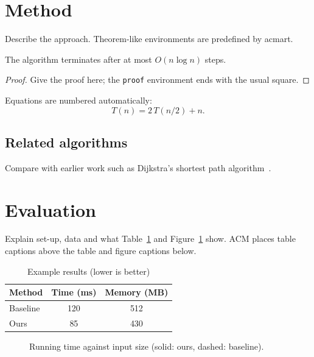 \documentclass[acmsmall]{acmart}
\begin{document}
\section{Method}\label{sec:method}
Describe the approach. Theorem-like environments are predefined by acmart.

\begin{theorem}\label{thm:bound}
  The algorithm terminates after at most $O(n \log n)$ steps.
\end{theorem}
\begin{proof}
  Give the proof here; the \texttt{proof} environment ends with the usual square.
\end{proof}

Equations are numbered automatically:
\begin{equation}
  T(n) = 2\,T(n/2) + n .
  \label{eq:recurrence}
\end{equation}

\subsection{Related algorithms}
Compare with earlier work such as Dijkstra's shortest path algorithm~\cite{dijkstra59}.

\section{Evaluation}\label{sec:eval}
Explain set-up, data and what Table~\ref{tab:results} and Figure~\ref{fig:scaling} show.
ACM places table captions above the table and figure captions below.

\begin{table}[ht]
  \caption{Example results (lower is better)}
  \label{tab:results}
  \begin{tabular}{lcc}
    \toprule
    Method & Time (ms) & Memory (MB) \\
    \midrule
    Baseline & 120 & 512 \\
    Ours & 85 & 430 \\
    \bottomrule
  \end{tabular}
\end{table}

\begin{figure}[ht]
  \centering
  \caption{Running time against input size (solid: ours, dashed: baseline).}
  \label{fig:scaling}
\end{figure}
\end{document}
